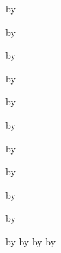 \newcount\CoauthorE
{}
\advance\CoauthorCitations by \CoauthorE



\newcount\CollaboratorCitations
{}

\newcount\CollaboratorA
{}
\advance\CollaboratorCitations by \CollaboratorA

\newcount\CollaboratorB
{}
\advance\CollaboratorCitations by \CollaboratorB

\newcount\CollaboratorC
{}
\advance\CollaboratorCitations by \CollaboratorC

\newcount\CollaboratorD
{}
\advance\CollaboratorCitations by \CollaboratorD

\newcount\CollaboratorE
{}
\advance\CollaboratorCitations by \CollaboratorE

\newcount\CollaboratorF
{}
\advance\CollaboratorCitations by \CollaboratorF

\newcount\CollaboratorG
{}
\advance\CollaboratorCitations by \CollaboratorG

\newcount\CollaboratorH
{}
\advance\CollaboratorCitations by \CollaboratorH

\newcount\CollaboratorI
{}
\advance\CollaboratorCitations by \CollaboratorI



\newcount\TotalCitations
{}

\advance\TotalCitations by \FirstAuthorCitations
\advance\TotalCitations by \StudentAuthorCitations
\advance\TotalCitations by \CoauthorCitations
\advance\TotalCitations by \CollaboratorCitations


